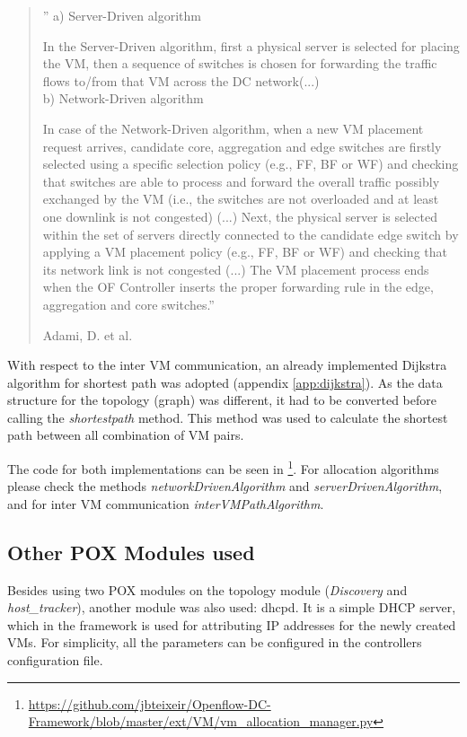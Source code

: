\documentclass[12pt,english,oneside]{book}
\begin{document}
\begin{quotation}
''
a) Server-Driven algorithm

In the Server-Driven algorithm, first a physical server is selected for placing the VM, then a sequence of switches is chosen for forwarding the traffic flows to/from that VM across the DC network(...)\\

b) Network-Driven algorithm

In case of the Network-Driven algorithm, when a new VM placement request arrives, candidate core, aggregation and edge switches are firstly selected using a specific selection policy (e.g., FF, BF or WF) and checking that switches are able to process and forward the overall traffic possibly exchanged by the VM (i.e., the switches are not overloaded and at least one downlink is not congested) (...) Next, the physical server is selected within the set of servers directly connected to the candidate edge switch by applying a VM placement policy (e.g., FF, BF or WF) and checking that its network link is not congested (...) The VM placement process ends when the OF Controller inserts the proper forwarding rule in the edge, aggregation and core switches.''

\hfill Adami, D. et al.\cite{im2013}
\end{quotation}

With respect to the inter VM communication, an already implemented Dijkstra algorithm for shortest path was adopted (appendix \ref{app:dijkstra}). As the data structure for the topology (graph) was different, it had to be converted before calling the \textit{shortestpath} method. This method was used to calculate the shortest path between all combination of VM pairs.

The code for both implementations can be seen in \footnote{\url{https://github.com/jbteixeir/Openflow-DC-Framework/blob/master/ext/VM/vm\_allocation\_manager.py}}. For allocation algorithms please check the methods \textit{networkDrivenAlgorithm} and \textit{serverDrivenAlgorithm}, and for inter VM communication \textit{interVMPathAlgorithm}.

\subsection{Other POX Modules used}
\hspace{0.6cm}

Besides using two POX modules on the topology module (\textit{Discovery} and \textit{host\_tracker}), another module was also used: dhcpd.
It is a simple DHCP server, which in the framework is used for attributing IP addresses for the newly created VMs.
For simplicity, all the parameters can be configured in the controllers configuration file.
\end{document}

